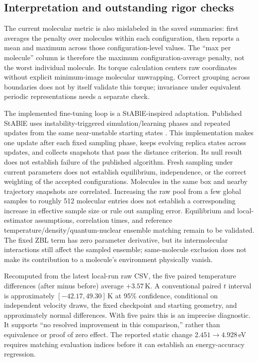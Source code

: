 \documentclass[11pt]{article}
\begin{document}
\subsection{Interpretation and outstanding rigor checks}

The current molecular metric is also mislabeled in the saved summaries:
 first averages the penalty over molecules
within each configuration, then reports a mean and maximum across those
configuration-level values. The ``max per molecule'' column is therefore
the maximum configuration-average penalty, not the worst individual
molecule. Its torque calculation centers raw coordinates without explicit
minimum-image molecular unwrapping. Correct grouping across boundaries
does not by itself validate this torque; invariance under equivalent
periodic representations needs a separate check.

The implemented fine-tuning loop is a StABlE-inspired adaptation.
Published StABlE uses instability-triggered simulation/learning phases and
repeated updates from the same near-unstable starting states
\citep{raja2025stable}. This implementation makes one update after each
fixed sampling phase, keeps evolving replica states across updates, and
collects snapshots that pass the distance criterion. Its null result does
not establish failure of the published algorithm. Fresh sampling under
current parameters does not establish equilibrium, independence, or the
correct weighting of the accepted configurations. Molecules in the same
box and nearby trajectory snapshots are correlated. Increasing the raw
pool from a few global samples to roughly 512 molecular entries does not
establish a corresponding increase in effective sample size or rule out
sampling error. Equilibrium and local-estimator assumptions, correlation
times, and reference temperature/density/quantum-nuclear ensemble matching
remain to be validated. The fixed ZBL term has zero parameter derivative,
but its intermolecular interactions still affect the sampled ensemble;
same-molecule exclusion does not make its contribution to a molecule's
environment physically vanish.

Recomputed from the latest local-run raw CSV, the five paired temperature
differences (after minus before) average $+3.57$\,K. A conventional paired
$t$ interval is approximately $[-42.17,49.30]$\,K at 95\% confidence,
conditional on independent velocity draws, the fixed checkpoint and
starting geometry, and approximately normal differences. With five pairs
this is an imprecise diagnostic. It supports ``no resolved improvement
in this comparison,'' rather than equivalence or proof of zero effect.
The reported static change $2.451\to4.928$\,eV requires matching evaluation
indices before it can establish an energy-accuracy regression.
\end{document}
